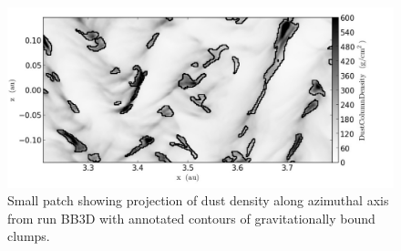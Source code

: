 \begin{figure} 
  \includegraphics[width=0.98\linewidth]{figures/fig6}
  \caption{
     Small patch showing projection of dust density along azimuthal axis from
     run BB3D with annotated contours of gravitationally bound clumps.}
  \label{fig6} 
\end{figure}

